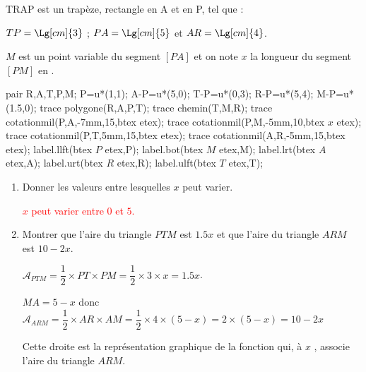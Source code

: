 \begin{corrige}
    TRAP est un trapèze, rectangle en A et en P, tel que :

    $TP=\Lg[cm]{3}$ ; $PA=\Lg[cm]{5}$ et $AR=\Lg[cm]{4}$.
    
    $M$ est un point variable du segment $[PA]$ et on note $x$ la longueur du segment $[PM]$ en \Lg[cm]{}.

    \begin{Geometrie}
        pair R,A,T,P,M;
        P=u*(1,1);
        A-P=u*(5,0);
        T-P=u*(0,3);
        R-P=u*(5,4);
        M-P=u*(1.5,0);
        trace polygone(R,A,P,T);
        trace chemin(T,M,R);
        trace cotationmil(P,A,-7mm,15,btex  etex);
        trace cotationmil(P,M,-5mm,10,btex $x$ etex);
        trace cotationmil(P,T,5mm,15,btex  etex);
        trace cotationmil(A,R,-5mm,15,btex  etex);
        label.llft(btex $P$ etex,P);
        label.bot(btex $M$ etex,M);
        label.lrt(btex $A$ etex,A);
        label.urt(btex $R$ etex,R);
        label.ulft(btex $T$ etex,T);        
    \end{Geometrie}

    \begin{enumerate}
        \item Donner les valeurs entre lesquelles $x$ peut varier.
        
        \textcolor{red}{$x$ peut varier entre $0$ et $5$.}
        \item Montrer que l’aire du triangle $PTM$ est $\num{1,5}x$ et que l’aire du triangle $ARM$ est $10-2x$.
        
        {\color{red}%
        $\mathcal{A}_{PTM}=\dfrac12 \times PT \times PM=\dfrac12 \times 3 \times x=\num{1.5} x$.

        $MA = 5-x$ donc $\mathcal{A}_{ARM}=\dfrac12 \times AR \times AM=\dfrac12 \times 4 \times (5-x) = 2\times (5-x)= 10-2x$
        }

        \medskip
        Cette droite est la représentation graphique de la fonction qui, à $x$ , associe l’aire du triangle $ARM$.


\end{enumerate}
\end{corrige}
